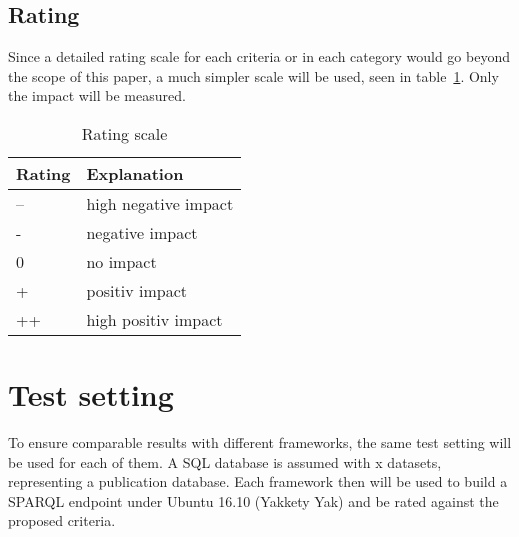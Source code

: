 \subsection{Rating}

Since a detailed rating scale for each criteria or in each category would go beyond the scope of this paper, a much simpler scale will be used, seen in table~\ref{tbl_rating}. Only the impact will be measured.

\begin{table}[]
\centering
\begin{tabular}{|l|l|}
\hline
\textbf{Rating} & \textbf{Explanation} \\ \hline
--              & high negative impact \\ \hline
-               & negative impact      \\ \hline
0               & no impact            \\ \hline
+               & positiv impact       \\ \hline
++              & high positiv impact  \\ \hline
\end{tabular}
\caption{Rating scale}
\label{tbl_rating}
\end{table}

\section{Test setting}
To ensure comparable results with different frameworks, the same test setting will be used for each of them. A SQL database is assumed with x  datasets, representing a publication database. Each framework then will be used to build a SPARQL endpoint under Ubuntu 16.10 (Yakkety Yak) and be rated against the proposed criteria.